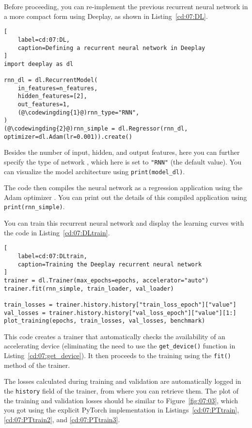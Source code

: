 Before proceeding, you can re-implement the previous recurrent neural network in a more compact form using Deeplay, as shown in Listing~\ref{cd:07:DL}.
\begin{lstlisting}[
    label=cd:07:DL,
    caption=Defining a recurrent neural network in Deeplay
]
import deeplay as dl

rnn_dl = dl.RecurrentModel(
    in_features=n_features, 
    hidden_features=[2],
    out_features=1,
    (@\codewingding{1}@)rnn_type="RNN",
)
(@\codewingding{2}@)rnn_simple = dl.Regressor(rnn_dl, optimizer=dl.Adam(lr=0.001)).create()
\end{lstlisting}
Besides the number of input, hidden, and output features, here you can further specify the type of network , which here is set to \lstinline{"RNN"} (the  default value). 
You can visualize the model architecture using \lstinline{print(model_dl)}.

The code then compiles the neural network as a regression application using the Adam optimizer . You can print out the details of this compiled application using \lstinline{print(rnn_simple)}.

You can train this recurrent neural network and display the learning curves with the code in Listing~\ref{cd:07:DLtrain}.
\begin{lstlisting}[
    label=cd:07:DLtrain,
    caption=Training the Deeplay recurrent neural network
]
trainer = dl.Trainer(max_epochs=epochs, accelerator="auto")
trainer.fit(rnn_simple, train_loader, val_loader)

train_losses = trainer.history.history["train_loss_epoch"]["value"]
val_losses = trainer.history.history["val_loss_epoch"]["value"][1:]
plot_training(epochs, train_losses, val_losses, benchmark)
\end{lstlisting}
This code creates a trainer that automatically checks the availability of an accelerating device (eliminating the need to use the \lstinline{get_device()} function in Listing~\ref{cd:07:get_device}).
It then proceeds to the training using the \lstinline{fit()} method of the trainer.

The losses calculated during training and validation are automatically logged in the \lstinline{history} field of the trainer, from where you can retrieve them.
The plot of the training and validation losses should be similar to Figure~\ref{fig:07:03}, which you got using the explicit PyTorch implementation in Listings~\ref{cd:07:PTtrain}, \ref{cd:07:PTtrain2}, and \ref{cd:07:PTtrain3}.

